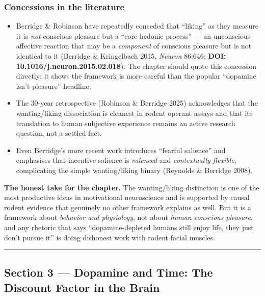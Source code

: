 \subsubsection{Concessions in the literature}\label{01_dopamine_substrate-concessions-in-the-literature}

\begin{itemize}
\tightlist
\item
  Berridge \& Robinson have repeatedly conceded that ``liking'' as they measure it is \emph{not} conscious pleasure but a ``core hedonic process'' --- an unconscious affective reaction that may be a \emph{component} of conscious pleasure but is not identical to it (Berridge \& Kringelbach 2015, \emph{Neuron} 86:646; \textbf{DOI: 10.1016/j.neuron.2015.02.018}). The chapter should quote this concession directly: it shows the framework is more careful than the popular ``dopamine isn't pleasure'' headline.
\item
  The 30-year retrospective (Robinson \& Berridge 2025) acknowledges that the wanting/liking dissociation is cleanest in rodent operant assays and that its translation to human subjective experience remains an active research question, not a settled fact.
\item
  Even Berridge's more recent work introduces ``fearful salience'' and emphasises that incentive salience is \emph{valenced} and \emph{contextually flexible}, complicating the simple wanting/liking binary (Reynolds \& Berridge 2008).
\end{itemize}

\textbf{The honest take for the chapter.} The wanting/liking distinction is one of the most productive ideas in motivational neuroscience and is supported by causal rodent evidence that genuinely no other framework explains as well. But it is a framework about \emph{behavior and physiology}, not about \emph{human conscious pleasure}, and any rhetoric that says ``dopamine-depleted humans still enjoy life, they just don't pursue it'' is doing dishonest work with rodent facial muscles.

\begin{center}\rule{0.5\linewidth}{0.5pt}\end{center}

\subsection{Section 3 --- Dopamine and Time: The Discount Factor in the Brain}\label{01_dopamine_substrate-section-3-dopamine-and-time-the-discount-factor-in-the-brain}

